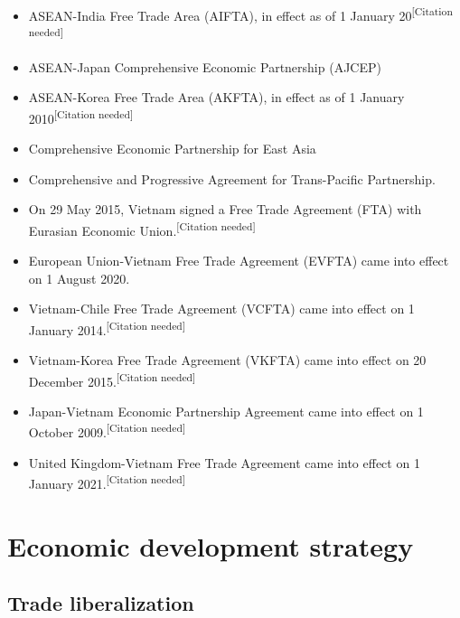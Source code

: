 \documentclass{article}
\begin{document}
    \begin{itemize}
        \vspace{-5pt}
                \item ASEAN-India Free Trade Area (AIFTA), in effect as of 1 January 20\textsuperscript{[Citation needed]}
                \item ASEAN-Japan Comprehensive Economic Partnership (AJCEP)
                \item ASEAN-Korea Free Trade Area (AKFTA), in effect as of 1 January 2010\textsuperscript{[Citation needed]}
                \item Comprehensive Economic Partnership for East Asia
                \item Comprehensive and Progressive Agreement for Trans-Pacific Partnership.
                \item On 29 May 2015, Vietnam signed a Free Trade Agreement (FTA) with Eurasian Economic Union.\textsuperscript{[Citation needed]}
                \item European Union-Vietnam Free Trade Agreement (EVFTA) came into effect on 1 August 2020.
                \item Vietnam-Chile Free Trade Agreement (VCFTA) came into effect on 1 January 2014.\textsuperscript{[Citation needed]}
                \item Vietnam-Korea Free Trade Agreement (VKFTA) came into effect on 20 December 2015.\textsuperscript{[Citation needed]}
                \item Japan-Vietnam Economic Partnership Agreement came into effect on 1 October 2009.\textsuperscript{[Citation needed]}
                \item United Kingdom-Vietnam Free Trade Agreement came into effect on 1 January 2021.\textsuperscript{[Citation needed]}
    \end{itemize}    


\section*{Economic development strategy}
\subsection*{Trade liberalization}
\end{document}
